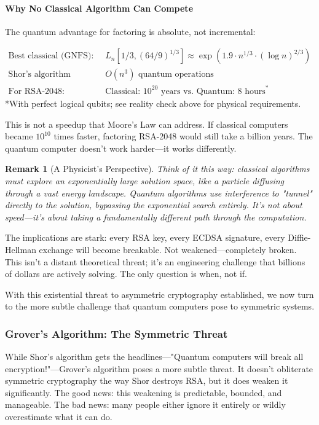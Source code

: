 \documentclass[11pt,a4paper]{article}
\newtheorem{remark}{Remark}
\begin{document}
\paragraph{Why No Classical Algorithm Can Compete}

The quantum advantage for factoring is absolute, not incremental:

\begin{align}
\text{Best classical (GNFS):} \quad &L_n[1/3, (64/9)^{1/3}] \approx \exp(1.9 \cdot n^{1/3} \cdot (\log n)^{2/3})\\
\text{Shor's algorithm (quantum):} \quad &O(n^3) \text{ quantum operations}\\
\text{For RSA-2048:} \quad &\text{Classical: } 10^{20} \text{ years vs. Quantum: } 8 \text{ hours}^*
\end{align}
*With perfect logical qubits; see reality check above for physical requirements.

This is not a speedup that Moore's Law can address. If classical computers became $10^{10}$ times faster, factoring RSA-2048 would still take a billion years. The quantum computer doesn't work harder---it works differently.

\begin{remark}[A Physicist's Perspective]
Think of it this way: classical algorithms must explore an exponentially large solution space, like a particle diffusing through a vast energy landscape. Quantum algorithms use interference to "tunnel" directly to the solution, bypassing the exponential search entirely. It's not about speed---it's about taking a fundamentally different path through the computation.
\end{remark}

The implications are stark: every RSA key, every ECDSA signature, every Diffie-Hellman exchange will become breakable. Not weakened---completely broken. This isn't a distant theoretical threat; it's an engineering challenge that billions of dollars are actively solving. The only question is when, not if.

With this existential threat to asymmetric cryptography established, we now turn to the more subtle challenge that quantum computers pose to symmetric systems.

\subsubsection{Grover's Algorithm: The Symmetric Threat}

While Shor's algorithm gets the headlines---"Quantum computers will break all encryption!"---Grover's algorithm poses a more subtle threat. It doesn't obliterate symmetric cryptography the way Shor destroys RSA, but it does weaken it significantly. The good news: this weakening is predictable, bounded, and manageable. The bad news: many people either ignore it entirely or wildly overestimate what it can do.
\end{document}
